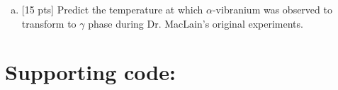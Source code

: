\begin{enumerate}
\begin{enumerate}[(a)]

      \item {[15 pts]} Predict the temperature at which
        $\alpha$-vibranium was
        observed to transform to $\gamma$ phase
        during Dr. MacLain’s original experiments.


    \end{enumerate}

\end{enumerate}

\section*{Supporting code:}

\inputminted{julia}{./calculations/src/calculations.jl}


